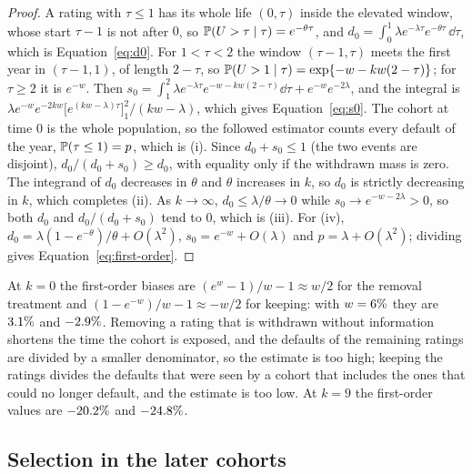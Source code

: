 \begin{proof}
A rating with $\tau\le1$ has its whole life $(0,\tau)$ inside the elevated window, whose start $\tau-1$ is not after $0$, so $\mathbb{P}(U>\tau\mid\tau)=e^{-\theta\tau}$, and $d_0=\int_0^1\lambda e^{-\lambda\tau}e^{-\theta\tau}\,\dd\tau$, which is Equation~\eqref{eq:d0}. For $1<\tau<2$ the window $(\tau-1,\tau)$ meets the first year in $(\tau-1,1)$, of length $2-\tau$, so $\mathbb{P}(U>1\mid\tau)=\exp\{-w-kw(2-\tau)\}$; for $\tau\ge2$ it is $e^{-w}$. Then $s_0=\int_1^2\lambda e^{-\lambda\tau}e^{-w-kw(2-\tau)}\dd\tau+e^{-w}e^{-2\lambda}$, and the integral is $\lambda e^{-w}e^{-2kw}\bigl[e^{(kw-\lambda)\tau}\bigr]_1^2/(kw-\lambda)$, which gives Equation~\eqref{eq:s0}. The cohort at time $0$ is the whole population, so the followed estimator counts every default of the year, $\mathbb{P}(\tau\le1)=p$, which is (i). Since $d_0+s_0\le1$ (the two events are disjoint), $d_0/(d_0+s_0)\ge d_0$, with equality only if the withdrawn mass is zero. The integrand of $d_0$ decreases in $\theta$ and $\theta$ increases in $k$, so $d_0$ is strictly decreasing in $k$, which completes (ii). As $k\to\infty$, $d_0\le\lambda/\theta\to0$ while $s_0\to e^{-w-2\lambda}>0$, so both $d_0$ and $d_0/(d_0+s_0)$ tend to $0$, which is (iii). For (iv), $d_0=\lambda(1-e^{-\theta})/\theta+O(\lambda^{2})$, $s_0=e^{-w}+O(\lambda)$ and $p=\lambda+O(\lambda^{2})$; dividing gives Equation~\eqref{eq:first-order}. %
\end{proof}

At $k=0$ the first-order biases are $(e^{w}-1)/w-1\approx w/2$ for the removal treatment and $(1-e^{-w})/w-1\approx-w/2$ for keeping: with $w=6\%$ they are $3.1\%$ and $-2.9\%$. Removing a rating that is withdrawn without information shortens the time the cohort is exposed, and the defaults of the remaining ratings are divided by a smaller denominator, so the estimate is too high; keeping the ratings divides the defaults that were seen by a cohort that includes the ones that could no longer default, and the estimate is too low. At $k=9$ the first-order values are $-20.2\%$ and $-24.8\%$. %

\subsection{Selection in the later cohorts}
\label{sec:theory-selection}

